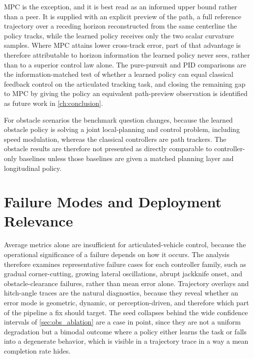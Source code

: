 MPC is the exception, and it is best read as an informed upper bound rather than a peer. It is supplied with an explicit preview of the path, a full reference trajectory over a receding horizon reconstructed from the same centerline the policy tracks, while the learned policy receives only the two scalar curvature samples. Where MPC attains lower cross-track error, part of that advantage is therefore attributable to horizon information the learned policy never sees, rather than to a superior control law alone. The pure-pursuit and PID comparisons are the information-matched test of whether a learned policy can equal classical feedback control on the articulated tracking task, and closing the remaining gap to MPC by giving the policy an equivalent path-preview observation is identified as future work in \cref{ch:conclusion}.

For obstacle scenarios the benchmark question changes, because the learned obstacle policy is solving a joint local-planning and control problem, including speed modulation, whereas the classical controllers are path trackers. The obstacle results are therefore not presented as directly comparable to controller-only baselines unless those baselines are given a matched planning layer and longitudinal policy.

\section{Failure Modes and Deployment Relevance}
\label{sec:failure_analysis}

Average metrics alone are insufficient for articulated-vehicle control, because the operational significance of a failure depends on how it occurs. The analysis therefore examines representative failure cases for each controller family, such as gradual corner-cutting, growing lateral oscillations, abrupt jackknife onset, and obstacle-clearance failures, rather than mean error alone. Trajectory overlays and hitch-angle traces are the natural diagnostics, because they reveal whether an error mode is geometric, dynamic, or perception-driven, and therefore which part of the pipeline a fix should target. The seed collapses behind the wide confidence intervals of \cref{sec:obs_ablation} are a case in point, since they are not a uniform degradation but a bimodal outcome where a policy either learns the task or falls into a degenerate behavior, which is visible in a trajectory trace in a way a mean completion rate hides.

